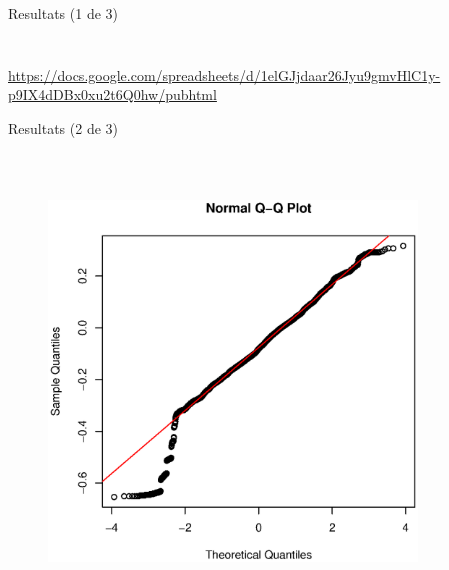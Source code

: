 \documentclass[xetex,mathserif,serif]{beamer}
\begin{document}
\begin{frame}{Resultats (1 de 3)}
\begin{columns}[T]
\begin{column}{0.4\linewidth}
\begin{figure}
      \end{figure}
    \end{column}
    \end{columns}
    \url{https://docs.google.com/spreadsheets/d/1elGJjdaar26Jyu9gmvHlC1y-p9IX4dDBx0xu2t6Q0hw/pubhtml}
  \end{frame}
  
  \begin{frame}{Resultats (2 de 3)}
    \begin{columns}[T]
    \begin{column}{0.4\linewidth}
      \\[2cm]
      \begin{figure}
      \includegraphics[width=1\linewidth]{images/qqplot}
      \end{figure}
    \end{column}
    \begin{column}{0.4\linewidth}
      \\[2cm]
      \begin{figure}

\end{figure}
\end{column}
\end{columns}
\end{frame}
\end{document}
